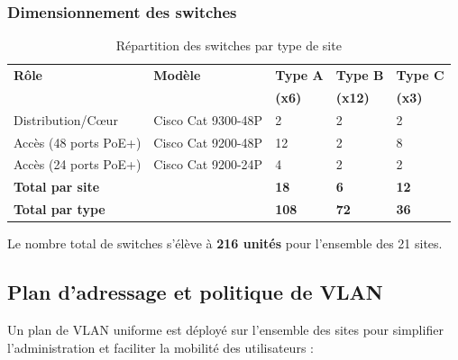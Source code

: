 \documentclass[12pt,a4paper]{report}
\begin{document}
\subsubsection{Dimensionnement des switches}

\begin{table}[H]
\centering
\small
\begin{tabularx}{\textwidth}{L{3.5cm}L{3cm}C{1.5cm}C{1.5cm}C{1.5cm}}
\toprule
\textbf{Rôle} & \textbf{Modèle} & \textbf{Type A} & \textbf{Type B} & \textbf{Type C} \\
& & \textbf{(x6)} & \textbf{(x12)} & \textbf{(x3)} \\
\midrule
Distribution/C\oe ur & Cisco Cat 9300-48P & 2 & 2 & 2 \\
Accès (48 ports PoE+) & Cisco Cat 9200-48P & 12 & 2 & 8 \\
Accès (24 ports PoE+) & Cisco Cat 9200-24P & 4 & 2 & 2 \\
\midrule
\textbf{Total par site} & & \textbf{18} & \textbf{6} & \textbf{12} \\
\textbf{Total par type} & & \textbf{108} & \textbf{72} & \textbf{36} \\
\bottomrule
\end{tabularx}
\caption{Répartition des switches par type de site}
\label{tab:switches}
\end{table}

Le nombre total de switches s'élève à \textbf{216 unités} pour l'ensemble des 21 sites.

\subsection{Plan d'adressage et politique de VLAN}

Un plan de VLAN uniforme est déployé sur l'ensemble des sites pour simplifier l'administration et faciliter la mobilité des utilisateurs :
\end{document}
